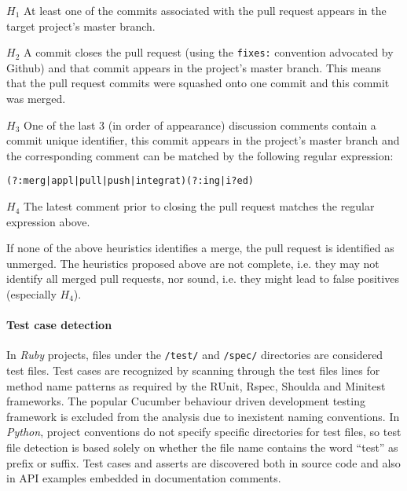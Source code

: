 \documentclass{sig-alternate}
\begin{document}
\begin{compactdesc}

  \item[$H_1$] At least one of the commits associated with the pull request appears in the target project's master branch.

  \item[$H_2$] A commit closes the pull request (using the \texttt{fixes:}
    convention advocated by Github) and that commit appears in the project's
    master branch.  This means that the pull request commits were squashed onto
    one commit and this commit was merged.

  \item[$H_3$] One of the last 3 (in order of appearance) discussion comments
    contain a commit unique identifier, this commit appears in the project's
    master branch and the corresponding comment can be matched by the following
    regular expression:

    \begin{small}
    \texttt{(?:merg|appl|pull|push|integrat)(?:ing|i?ed)}
    \end{small}

  \item[$H_4$] The latest comment prior to closing the pull request matches the
    regular expression above.

\end{compactdesc}

If none of the above heuristics identifies a merge, the pull request is
identified as unmerged. The heuristics proposed above are not complete, i.e. they may not identify all merged pull requests, nor sound, i.e. they might lead to false positives (especially $H_4$).

\paragraph*{Test case detection}
In \emph{Ruby} projects, files under the \texttt{/test/} and \texttt{/spec/}
directories are considered test files. Test cases are recognized by scanning
through the test files lines for method name patterns as required by the
\textsf{RUnit}, \textsf{Rspec}, \textsf{Shoulda} and \textsf{Minitest}
frameworks. The popular Cucumber behaviour driven development testing framework
is excluded from the analysis due to inexistent naming conventions.  In
\emph{Python}, project conventions do not specify specific directories for test
files, so test file detection is based solely on whether the file name contains
the word ``test'' as prefix or suffix. Test cases and asserts are discovered
both in source code and also in API examples embedded in documentation comments. 
\end{document}
